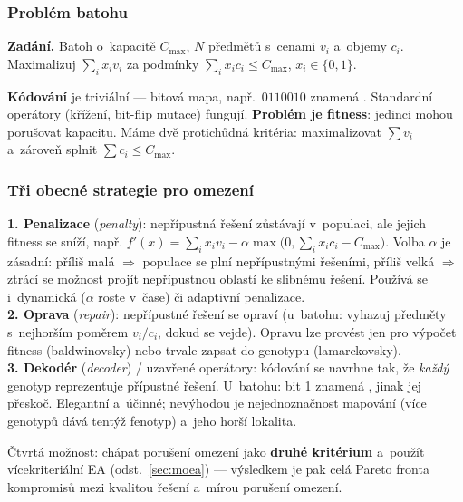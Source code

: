 \documentclass[11pt,a4paper]{article}
\theoremstyle{definition}
\begin{document}
\subsubsection{Problém batohu}

\textbf{Zadání.} Batoh o~kapacitě $C_{\max}$, $N$ předmětů s~cenami $v_i$
a~objemy $c_i$. Maximalizuj $\sum_i x_i v_i$ za podmínky
$\sum_i x_i c_i \le C_{\max}$, $x_i \in \{0,1\}$.

\textbf{Kódování} je triviální --- bitová mapa, např.\ $0110010$ znamená
. Standardní operátory (křížení, bit-flip mutace)
fungují. \textbf{Problém je fitness}: jedinci mohou porušovat kapacitu.
Máme dvě protichůdná kritéria: maximalizovat $\sum v_i$ a~zároveň splnit
$\sum c_i \le C_{\max}$.

\subsubsection{Tři obecné strategie pro omezení}

\begin{defbox}
\textbf{1. Penalizace} (\emph{penalty}): nepřípustná řešení zůstávají
v~populaci, ale jejich fitness se sníží, např.
$f'(x) = \sum_i x_i v_i - \alpha \max\big(0, \sum_i x_i c_i - C_{\max}\big)$.
Volba $\alpha$ je zásadní: příliš malá $\Rightarrow$ populace se plní
nepřípustnými řešeními, příliš velká $\Rightarrow$ ztrácí se možnost projít
nepřípustnou oblastí ke slibnému řešení. Používá se i~dynamická
($\alpha$ roste v~čase) či adaptivní penalizace.\\
\textbf{2. Oprava} (\emph{repair}): nepřípustné řešení se opraví
(u~batohu: vyhazuj předměty s~nejhorším poměrem $v_i/c_i$, dokud se vejde).
Opravu lze provést jen pro výpočet fitness (baldwinovsky) nebo trvale
zapsat do genotypu (lamarckovsky).\\
\textbf{3. Dekodér} (\emph{decoder}) / uzavřené operátory: kódování se navrhne
tak, že \emph{každý} genotyp reprezentuje přípustné řešení. U~batohu: bit
1 znamená , jinak jej přeskoč.
Elegantní a~účinné; nevýhodou je ne\-jed\-no\-znač\-nost mapování (více
genotypů dává tentýž fenotyp) a~jeho horší lokalita.
\end{defbox}

Čtvrtá možnost: chápat porušení omezení jako \textbf{druhé kritérium}
a~použít vícekriteriální EA (odst.~\ref{sec:moea}) --- výsledkem je pak celá
Pareto fronta kompromisů mezi kvalitou řešení a~mírou porušení omezení.
\end{document}
